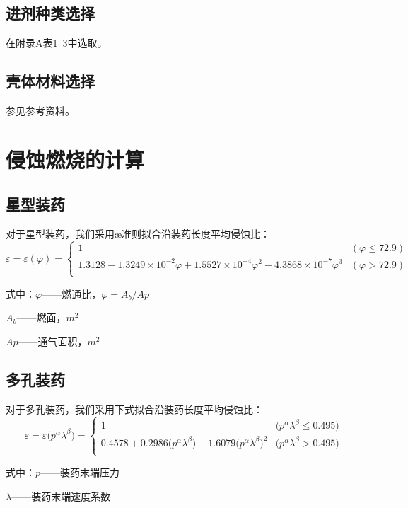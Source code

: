 \subsection{进剂种类选择}

在附录A表1~3中选取。

\subsection{壳体材料选择}


参见参考资料\citep{wangyouyuan}。

\section{侵蚀燃烧的计算}

\subsection{星型装药}

对于星型装药，我们采用æ准则拟合沿装药长度平均侵蚀比：
\[
    \overline{\varepsilon }=\overline{\varepsilon }\left( \varphi \right) =\left\{ \begin{matrix}
        1&		(\varphi \le 72.9)\\
        1.3128-1.3249\times 10^{-2}\varphi +1.5527\times 10^{-4}\varphi ^2-4.3868\times 10^{-7}\varphi ^3&		(\varphi >72.9)\\
    \end{matrix} \right. 
\]

式中：$\varphi$——燃通比，$\varphi=A_{b}/A{p}$

\qquad\quad$A_{b}$——燃面，$m^{2}$

\qquad\quad$A{p}$——通气面积，$m^{2}$

\subsection{多孔装药}

对于多孔装药，我们采用下式拟合沿装药长度平均侵蚀比：
\[
  \overline{\varepsilon }=\overline{\varepsilon }\bigl( p^{\alpha}\lambda ^{\beta} \bigr) =\left\{ \begin{matrix}
    1&		\bigl( p^{\alpha}\lambda ^{\beta}\le 0.495 \bigr)\\
    0.4578+0.2986\bigl( p^{\alpha}\lambda ^{\beta} \bigr) +1.6079\bigl( p^{\alpha}\lambda ^{\beta} \bigr) ^2&		\bigl( p^{\alpha}\lambda ^{\beta}>0.495 \bigr)\\
  \end{matrix} \right. 
\]

式中：$p$——装药末端压力

\qquad\quad$\lambda $——装药末端速度系数